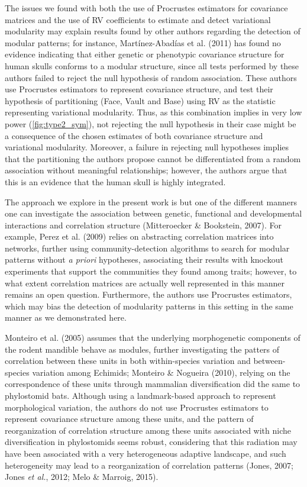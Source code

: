 \documentclass[12pt,twoside]{report}
\begin{document}
The issues we found with both the use of Procrustes estimators for
covariance matrices and the use of RV coefficients to estimate and
detect variational modularity may explain results found by other authors
regarding the detection of modular patterns; for instance,
Martínez-Abadías et al. (2011) has found no evidence indicating that
either genetic or phenotypic covariance structure for human skulls
conforms to a modular structure, since all tests performed by these
authors failed to reject the null hypothesis of random association.
These authors use Procrustes estimators to represent covariance
structure, and test their hypothesis of partitioning (Face, Vault and
Base) using RV as the statistic representing variational modularity.
Thus, as this combination implies in very low power
(\autoref{fig:type2_sym}), not rejecting the null hypothesis in their
case might be a consequence of the chosen estimates of both covariance
structure and variational modularity. Moreover, a failure in rejecting
null hypotheses implies that the partitioning the authors propose cannot
be differentiated from a random association without meaningful
relationships; however, the authors argue that this is an evidence that
the human skull is highly integrated.

The approach we explore in the present work is but one of the different
manners one can investigate the association between genetic, functional
and developmental interactions and correlation structure (Mitteroecker
\& Bookstein, 2007). For example, Perez et al. (2009) relies on
abstracting correlation matrices into networks, further using
community-detection algorithms to search for modular patterns without
\emph{a priori} hypotheses, associating their results with knockout
experiments that support the communities they found among traits;
however, to what extent correlation matrices are actually well
represented in this manner remains an open question. Furthermore, the
authors use Procrustes estimators, which may bias the detection of
modularity patterns in this setting in the same manner as we
demonstrated here.

Monteiro et al. (2005) assumes that the underlying morphogenetic
components of the rodent mandible behave as modules, further
investigating the patters of correlation between these units in both
within-species variation and between-species variation among Echimids;
Monteiro \& Nogueira (2010), relying on the correspondence of these
units through mammalian diversification did the same to phylostomid
bats. Although using a landmark-based approach to represent
morphological variation, the authors do not use Procrustes estimators to
represent covariance structure among these units, and the pattern of
reorganization of correlation structure among these units associated
with niche diversification in phylostomids seems robust, considering
that this radiation may have been associated with a very heterogeneous
adaptive landscape, and such heterogeneity may lead to a reorganization
of correlation patterns (Jones, 2007; Jones \emph{et al.}, 2012; Melo \&
Marroig, 2015).
\end{document}
